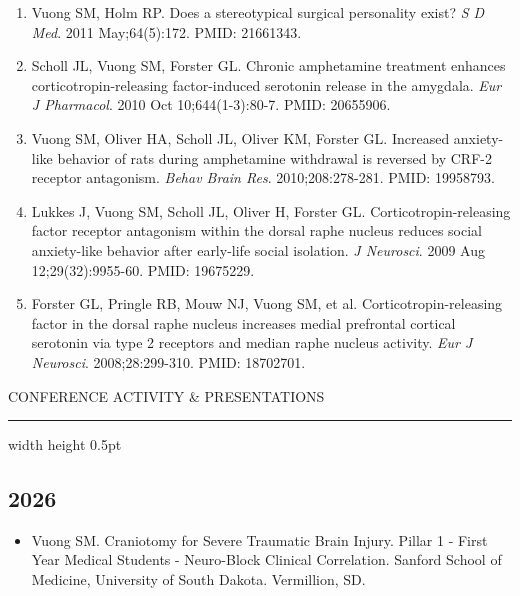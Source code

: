 \documentclass[11pt, a4paper]{article}
\newcommand{\cvsection}[1]{%
  \par\vspace{1.5ex}%
  {\Large\color{primary}\scshape\MakeUppercase{#1}}%
  \nopagebreak[4]%
  \vspace{0.3em}%
  \nopagebreak[4]%
  \hrule width \linewidth height 0.5pt \color{primary}%
  \vspace{0.5ex}%
}
\begin{document}
\begin{enumerate}
  \item Vuong SM, Holm RP. Does a stereotypical surgical personality exist? \textit{S D Med}. 2011 May;64(5):172. PMID: 21661343.
  
  \item Scholl JL, Vuong SM, Forster GL. Chronic amphetamine treatment enhances corticotropin-releasing factor-induced serotonin release in the amygdala. \textit{Eur J Pharmacol}. 2010 Oct 10;644(1-3):80-7. PMID: 20655906.
  
  \item Vuong SM, Oliver HA, Scholl JL, Oliver KM, Forster GL. Increased anxiety-like behavior of rats during amphetamine withdrawal is reversed by CRF-2 receptor antagonism. \textit{Behav Brain Res}. 2010;208:278-281. PMID: 19958793.
  
  \item Lukkes J, Vuong SM, Scholl JL, Oliver H, Forster GL. Corticotropin-releasing factor receptor antagonism within the dorsal raphe nucleus reduces social anxiety-like behavior after early-life social isolation. \textit{J Neurosci}. 2009 Aug 12;29(32):9955-60. PMID: 19675229.
  
  \item Forster GL, Pringle RB, Mouw NJ, Vuong SM, et al. Corticotropin-releasing factor in the dorsal raphe nucleus increases medial prefrontal cortical serotonin via type 2 receptors and median raphe nucleus activity. \textit{Eur J Neurosci}. 2008;28:299-310. PMID: 18702701.
  
\end{enumerate}

\cvsection{Conference Activity \& Presentations}

\subsection{2026}
\begin{itemize}
  \setlength\itemindent{0.25em}
  \item Vuong SM. Craniotomy for Severe Traumatic Brain Injury. Pillar 1 - First Year Medical Students - Neuro-Block Clinical Correlation. Sanford School of Medicine, University of South Dakota. Vermillion, SD.
\end{itemize}
\end{document}
